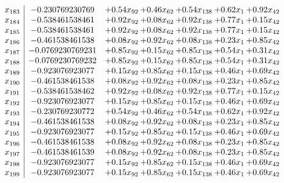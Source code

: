 \documentclass[8pt]{article}
\begin{document}
\[\begin{array}{c| c c@{\hskip 2pt} c@{\hskip 2pt} c@{\hskip 2pt} c@{\hskip 2pt} c@{\hskip 2pt} }
 x_{183}   &  -0.230769230769 & +  0.54 x_{92} & +  0.46 x_{62} & +  0.54 x_{138} & +  0.62 x_{1} & +  0.92 x_{42}\\
 x_{184}   &  -0.538461538461 & +  0.92 x_{92} & +  0.08 x_{62} & +  0.92 x_{138} & +  0.77 x_{1} & +  0.15 x_{42}\\
 x_{185}   &  -0.538461538461 & +  0.92 x_{92} & +  0.08 x_{62} & +  0.92 x_{138} & +  0.77 x_{1} & +  0.15 x_{42}\\
 x_{186}   &  -0.461538461538 & +  0.08 x_{92} & +  0.92 x_{62} & +  0.08 x_{138} & +  0.23 x_{1} & +  0.85 x_{42}\\
 x_{187}   &  -0.0769230769231 & +  0.85 x_{92} & +  0.15 x_{62} & +  0.85 x_{138} & +  0.54 x_{1} & +  0.31 x_{42}\\
 x_{188}   &  -0.0769230769232 & +  0.85 x_{92} & +  0.15 x_{62} & +  0.85 x_{138} & +  0.54 x_{1} & +  0.31 x_{42}\\
 x_{189}   &  -0.923076923077 & +  0.15 x_{92} & +  0.85 x_{62} & +  0.15 x_{138} & +  0.46 x_{1} & +  0.69 x_{42}\\
 x_{190}   &  -0.461538461538 & +  0.08 x_{92} & +  0.92 x_{62} & +  0.08 x_{138} & +  0.23 x_{1} & +  0.85 x_{42}\\
 x_{191}   &  -0.538461538462 & +  0.92 x_{92} & +  0.08 x_{62} & +  0.92 x_{138} & +  0.77 x_{1} & +  0.15 x_{42}\\
 x_{192}   &  -0.923076923077 & +  0.15 x_{92} & +  0.85 x_{62} & +  0.15 x_{138} & +  0.46 x_{1} & +  0.69 x_{42}\\
 x_{193}   &  -0.230769230772 & +  0.54 x_{92} & +  0.46 x_{62} & +  0.54 x_{138} & +  0.62 x_{1} & +  0.92 x_{42}\\
 x_{194}   &  -0.461538461538 & +  0.08 x_{92} & +  0.92 x_{62} & +  0.08 x_{138} & +  0.23 x_{1} & +  0.85 x_{42}\\
 x_{195}   &  -0.923076923077 & +  0.15 x_{92} & +  0.85 x_{62} & +  0.15 x_{138} & +  0.46 x_{1} & +  0.69 x_{42}\\
 x_{196}   &  -0.461538461538 & +  0.08 x_{92} & +  0.92 x_{62} & +  0.08 x_{138} & +  0.23 x_{1} & +  0.85 x_{42}\\
 x_{197}   &  -0.461538461539 & +  0.08 x_{92} & +  0.92 x_{62} & +  0.08 x_{138} & +  0.23 x_{1} & +  0.85 x_{42}\\
 x_{198}   &  -0.923076923077 & +  0.15 x_{92} & +  0.85 x_{62} & +  0.15 x_{138} & +  0.46 x_{1} & +  0.69 x_{42}\\
 x_{199}   &  -0.923076923077 & +  0.15 x_{92} & +  0.85 x_{62} & +  0.15 x_{138} & +  0.46 x_{1} & +  0.69 x_{42}\\

\end{array}\]
\end{document}
